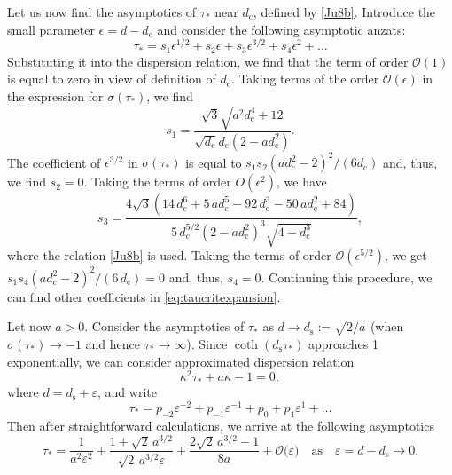 \documentclass[oneside,a4paper,11pt]{article}
\theoremstyle{thmstyletwo}%
\theoremstyle{thmstylethree}%
\numberwithin{equation}{section}
\def\dcrit{d_{\textrm{c}}}
\def\ds{d_{\textrm{s}}}
\def\taust{\tau_{*}}
\def\Disp{\sigma}
\def\dUd{\kappa}
\def\mddU{a}
\def\Obig{\mathcal{O}}
\begin{document}
Let us now find the asymptotics of $\taust$ near $\dcrit$, defined by \eqref{Ju8b}.
Introduce the small parameter \mbox{$\epsilon=d-\dcrit$} and consider the following asymptotic anzats:
\begin{equation}
\taust=s_1\epsilon^{1/2}+s_2\epsilon+
s_3\epsilon^{3/2}+s_4\epsilon^2+\dots
\label{eq:taucritexpansion}
\end{equation}
Substituting it into the dispersion relation, we find that the term of order $\Obig(1)$ is equal to zero
in view of definition of $\dcrit$. Taking terms of the order $\Obig(\epsilon)$ in the expression for $\Disp(\taust)$, we find
\begin{equation*}
s_1=\frac{\sqrt{3}\sqrt{a^{2} \dcrit^{4}+12}}{\sqrt{\dcrit}\dcrit( 2-a \dcrit^{2} )}.
\end{equation*}
The coefficient of $\epsilon^{3/2}$ in $\Disp(\taust)$ is equal to $s_1 s_2 (a \dcrit^2-2)^2/(6\dcrit)$ and, thus, we find $s_2=0$. Taking the terms of order $O(\epsilon^2)$, we have
\begin{equation*}
s_3=\frac{
4\sqrt{3}(14\,\dcrit^6+5\,a\dcrit^5-92\,\dcrit^3-50\,a\dcrit^2+84)}
{5\,\dcrit^{5/2}(2-a\dcrit^2)^3\sqrt{4-\dcrit^3}},
\end{equation*}
where  the relation \eqref{Ju8b} is used.
Taking the terms of  order $\Obig(\epsilon^{5/2})$, we get $s_1 s_4 (a \dcrit^2-2)^2/(6\, \dcrit)=0$ and, thus, $s_4=0$. Continuing this procedure, we can find other coefficients in \eqref{eq:taucritexpansion}.


Let now $a>0$. Consider the asymptotics of $\taust$ as $d\to \ds:=\sqrt{2/a}$ (when $\Disp(\taust)\to-1$ and hence $\taust\to\infty$). Since $\coth(\ds\taust)$ approaches 1 exponentially, we
can consider approximated dispersion relation
\begin{equation*}
\dUd^2 \taust+\mddU\dUd-1=0,
\end{equation*}
where $d=\ds+\varepsilon$, and write
\[
\taust=p_{-2}\varepsilon^{-2}+p_{-1}\varepsilon^{-1}+p_0+p_1\varepsilon^{1}+\dots
\]
Then after straightforward calculations, we arrive at the following asymptotics
\begin{equation}
\taust=\frac{1}{a^2\varepsilon^2}+\frac{1+\sqrt{2}\,a^{3/2}}{\sqrt{2}\,a^{3/2}\varepsilon}+\frac{2\sqrt{2}\,a^{3/2}-1}{8a}
+\Obig\bigl(\varepsilon\bigr)\quad\mbox{as}\quad\varepsilon=d-\ds\to0.
\label{eq:taustasinf}
\end{equation}
\end{document}
